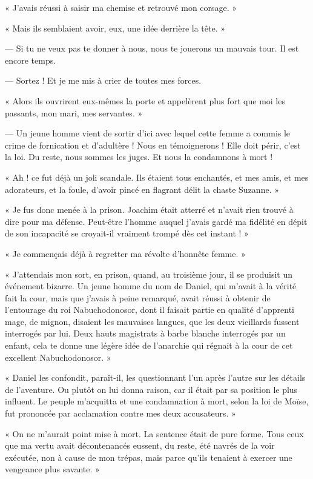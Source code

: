 \documentclass[a4paper, 11pt, oneside, polutonikogreek, french]{article}
\begin{document}
« J'avais réussi à saisir ma chemise et retrouvé mon corsage. »

« Mais ils semblaient avoir, eux, une idée derrière la tête. »

--- Si tu ne veux pas te donner à nous, nous te jouerons un mauvais tour. Il est encore temps.

--- Sortez ! Et je me mis à crier de toutes mes forces.

« Alors ils ouvrirent eux-mêmes la porte et appelèrent plus fort que moi les passants, mon mari, mes servantes. »

--- Un jeune homme vient de sortir d'ici avec lequel cette femme a commis le crime de fornication et d'adultère ! Nous en témoignerons ! Elle doit périr, c'est la loi. Du reste, nous sommes les juges. Et nous la condamnons à mort !

« Ah ! ce fut déjà un joli scandale. Ils étaient tous enchantés, et mes amis, et mes adorateurs, et la foule, d'avoir pincé en flagrant délit la chaste Suzanne. »

« Je fus donc menée à la prison. Joachim était atterré et n'avait rien trouvé à dire pour ma défense. Peut-être l'homme auquel j'avais gardé ma fidélité en dépit de son incapacité se croyait-il vraiment trompé dès cet instant ! »

« Je commençais déjà à regretter ma révolte d'honnête femme. »

« J'attendais mon sort, en prison, quand, au troisième jour, il se produisit un événement bizarre. Un jeune homme du nom de Daniel, qui m'avait à la vérité fait la cour, mais que j'avais à peine remarqué, avait réussi à obtenir de l'entourage du roi Nabuchodonosor, dont il faisait partie en qualité d'apprenti mage, de mignon, disaient les mauvaises langues, que les deux vieillards fussent interrogés par lui. Deux hauts magistrats à barbe blanche interrogés par un enfant, cela te donne une légère idée de l'anarchie qui régnait à la cour de cet excellent Nabuchodonosor. »

« Daniel les confondit, paraît-il, les questionnant l'un après l'autre sur les détails de l'aventure. Ou plutôt on lui donna raison, car il était par sa position le plus influent. Le peuple m'acquitta et une condamnation à mort, selon la loi de Moïse, fut prononcée par acclamation contre mes deux accusateurs. »

« On ne m'aurait point mise à mort. La sentence était de pure forme. Tous ceux que ma vertu avait décontenancés eussent, du reste, été navrés de la voir exécutée, non à cause de mon trépas, mais parce qu'ils tenaient à exercer une vengeance plus savante. »
\end{document}
